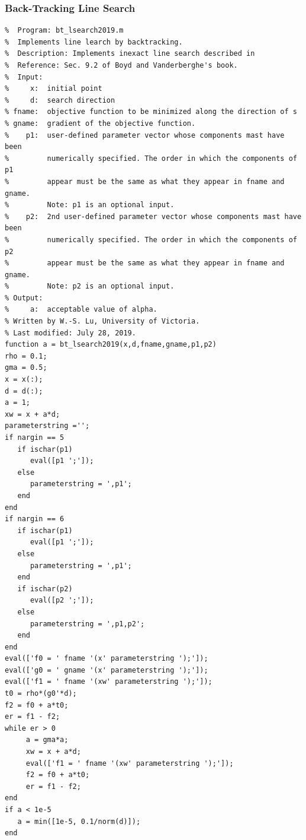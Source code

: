 \documentclass[12pt,conference]{IEEEtran}
\begin{document}
\begin{appendices}
\subsubsection{Back-Tracking Line Search}
\label{AppendixB-BTLS}
\begin{verbatim}
%  Program: bt_lsearch2019.m
%  Implements line learch by backtracking.
%  Description: Implements inexact line search described in 
%  Reference: Sec. 9.2 of Boyd and Vanderberghe's book.
%  Input:
%     x:  initial point
%     d:  search direction
% fname:  objective function to be minimized along the direction of s  
% gname:  gradient of the objective function.
%    p1:  user-defined parameter vector whose components mast have been 
%         numerically specified. The order in which the components of p1 
%         appear must be the same as what they appear in fname and gname.
%         Note: p1 is an optional input.
%    p2:  2nd user-defined parameter vector whose components mast have been 
%         numerically specified. The order in which the components of p2 
%         appear must be the same as what they appear in fname and gname.
%         Note: p2 is an optional input.
% Output:
%     a:  acceptable value of alpha.
% Written by W.-S. Lu, University of Victoria.
% Last modified: July 28, 2019.
function a = bt_lsearch2019(x,d,fname,gname,p1,p2)
rho = 0.1;
gma = 0.5;
x = x(:);
d = d(:);
a = 1;
xw = x + a*d;
parameterstring ='';
if nargin == 5
   if ischar(p1)
      eval([p1 ';']);
   else
      parameterstring = ',p1';
   end
end
if nargin == 6
   if ischar(p1)
      eval([p1 ';']);
   else
      parameterstring = ',p1';
   end
   if ischar(p2)
      eval([p2 ';']);
   else
      parameterstring = ',p1,p2';
   end
end
eval(['f0 = ' fname '(x' parameterstring ');']);
eval(['g0 = ' gname '(x' parameterstring ');']);
eval(['f1 = ' fname '(xw' parameterstring ');']);
t0 = rho*(g0'*d);
f2 = f0 + a*t0;
er = f1 - f2;
while er > 0
     a = gma*a;
     xw = x + a*d;
     eval(['f1 = ' fname '(xw' parameterstring ');']);
     f2 = f0 + a*t0;
     er = f1 - f2;
end
if a < 1e-5
   a = min([1e-5, 0.1/norm(d)]); 
end 
\end{verbatim}
\end{appendices}
\end{document}
